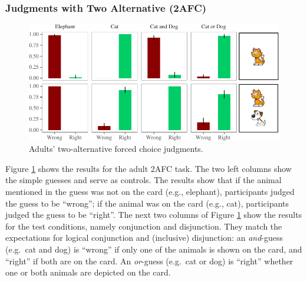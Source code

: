 \documentclass[oneside]{report}
\theoremstyle{definition}
\theoremstyle{definition}
\theoremstyle{definition}
\theoremstyle{remark}
\begin{document}
\subsubsection{Judgments with Two Alternative
(2AFC)}\label{judgments-with-two-alternative-2afc}
\begin{figure}[t]

{\centering \includegraphics{figs/binaryAdultsPlot-1} 

}

\caption{Adults' two-alternative forced choice judgments.}\label{fig:binaryAdultsPlot}
\end{figure}
Figure \ref{fig:binaryAdultsPlot} shows the results for the adult 2AFC
task. The two left columns show the simple guesses and serve as
controls. The results show that if the animal mentioned in the guess was
not on the card (e.g., elephant), participants judged the guess to be
``wrong''; if the animal was on the card (e.g., cat), participants
judged the guess to be ``right''. The next two columns of Figure
\ref{fig:binaryAdultsPlot} show the results for the test conditions,
namely conjunction and disjunction. They match the expectations for
logical conjunction and (inclusive) disjunction: an \emph{and}-guess
(e.g.~cat and dog) is ``wrong'' if only one of the animals is shown on
the card, and ``right'' if both are on the card. An \emph{or}-guess
(e.g.~cat or dog) is ``right'' whether one or both animals are depicted
on the card.
\end{document}
